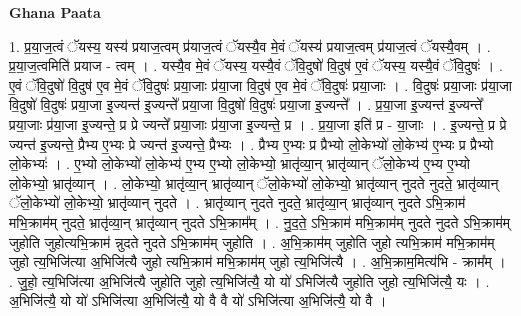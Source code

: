 \documentclass[17pt]{extarticle}
\begin{document}
\textbf{Ghana Paata } \newline

1. प्र॒या॒ज॒त्वं ॅयस्य॒ यस्य॑ प्रयाज॒त्वम् प्र॑याज॒त्वं ॅयस्यै॒व मे॒वं ॅयस्य॑ प्रयाज॒त्वम् प्र॑याज॒त्वं ॅयस्यै॒वम् । . प्र॒या॒ज॒त्वमिति॑ प्रयाज - त्वम् । . यस्यै॒व मे॒वं ॅयस्य॒ यस्यै॒वं ॅवि॒दुषो॑ वि॒दुष॑ ए॒वं ॅयस्य॒ यस्यै॒वं ॅवि॒दुषः॑ । . ए॒वं ॅवि॒दुषो॑ वि॒दुष॑ ए॒व मे॒वं ॅवि॒दुषः॑ प्रया॒जाः प्र॑या॒जा वि॒दुष॑ ए॒व मे॒वं ॅवि॒दुषः॑ प्रया॒जाः । . वि॒दुषः॑ प्रया॒जाः प्र॑या॒जा वि॒दुषो॑ वि॒दुषः॑ प्रया॒जा इ॒ज्यन्त॑ इ॒ज्यन्ते᳚ प्रया॒जा वि॒दुषो॑ वि॒दुषः॑ प्रया॒जा इ॒ज्यन्ते᳚ । . प्र॒या॒जा इ॒ज्यन्त॑ इ॒ज्यन्ते᳚ प्रया॒जाः प्र॑या॒जा इ॒ज्यन्ते॒ प्र प्रे ज्यन्ते᳚ प्रया॒जाः प्र॑या॒जा इ॒ज्यन्ते॒ प्र । . प्र॒या॒जा इति॑ प्र - या॒जाः । . इ॒ज्यन्ते॒ प्र प्रे ज्यन्त॑ इ॒ज्यन्ते॒ प्रैभ्य ए॒भ्यः प्रे ज्यन्त॑ इ॒ज्यन्ते॒ प्रैभ्यः । . प्रैभ्य ए॒भ्यः प्र प्रैभ्यो लो॒केभ्यो॑ लो॒केभ्य॑ ए॒भ्यः प्र प्रैभ्यो लो॒केभ्यः॑ । . ए॒भ्यो लो॒केभ्यो॑ लो॒केभ्य॑ ए॒भ्य ए॒भ्यो लो॒केभ्यो॒ भ्रातृ॑व्या॒न् भ्रातृ॑व्यान् ॅलो॒केभ्य॑ ए॒भ्य ए॒भ्यो लो॒केभ्यो॒ भ्रातृ॑व्यान् । . लो॒केभ्यो॒ भ्रातृ॑व्या॒न् भ्रातृ॑व्यान् ॅलो॒केभ्यो॑ लो॒केभ्यो॒ भ्रातृ॑व्यान् नुदते नुदते॒ भ्रातृ॑व्यान् ॅलो॒केभ्यो॑ लो॒केभ्यो॒ भ्रातृ॑व्यान् नुदते । . भ्रातृ॑व्यान् नुदते नुदते॒ भ्रातृ॑व्या॒न् भ्रातृ॑व्यान् नुदते ऽभि॒क्राम॑ मभि॒क्राम॑म् नुदते॒ भ्रातृ॑व्या॒न् भ्रातृ॑व्यान् नुदते ऽभि॒क्राम᳚म् । . नु॒द॒ते॒ ऽभि॒क्राम॑ मभि॒क्राम॑म् नुदते नुदते ऽभि॒क्राम॑म् जुहोति जुहोत्यभि॒क्राम॑ न्नुदते नुदते ऽभि॒क्राम॑म् जुहोति । . अ॒भि॒क्राम॑म् जुहोति जुहो त्यभि॒क्राम॑ मभि॒क्राम॑म् जुहो त्य॒भिजि॑त्या अ॒भिजि॑त्यै जुहो त्यभि॒क्राम॑ मभि॒क्राम॑म् जुहो त्य॒भिजि॑त्यै । . अ॒भि॒क्राम॒मित्य॑भि - क्राम᳚म् । . जु॒हो॒ त्य॒भिजि॑त्या अ॒भिजि॑त्यै जुहोति जुहो त्य॒भिजि॑त्यै॒ यो यो॑ ऽभिजि॑त्यै जुहोति जुहो त्य॒भिजि॑त्यै॒ यः । . अ॒भिजि॑त्यै॒ यो यो॑ ऽभिजि॑त्या अ॒भिजि॑त्यै॒ यो वै वै यो॑ ऽभिजि॑त्या अ॒भिजि॑त्यै॒ यो वै । \newline
\end{document}
